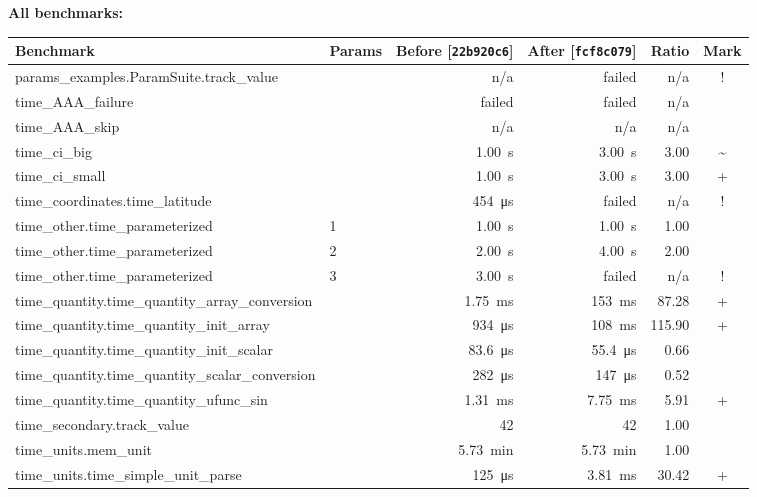 
\noindent
\textbf{All benchmarks:}

\begin{tabular}{llrrrc}
\toprule
Benchmark & Params & Before [\texttt{22b920c6}] & After [\texttt{fcf8c079}] & Ratio & Mark \\
\midrule
params\_examples.ParamSuite.track\_value &  & n/a & failed & n/a & ! \\
time\_AAA\_failure &  & failed & failed & n/a &  \\
time\_AAA\_skip &  & n/a & n/a & n/a &  \\
time\_ci\_big &  & \qty{1.00}{\second} & \qty{3.00}{\second} & \num{3.00} & \textasciitilde{} \\
time\_ci\_small &  & \qty{1.00}{\second} & \qty{3.00}{\second} & \num{3.00} & + \\
time\_coordinates.time\_latitude &  & \qty{454}{\micro\second} & failed & n/a & ! \\
time\_other.time\_parameterized & 1 & \qty{1.00}{\second} & \qty{1.00}{\second} & \num{1.00} &  \\
time\_other.time\_parameterized & 2 & \qty{2.00}{\second} & \qty{4.00}{\second} & \num{2.00} &  \\
time\_other.time\_parameterized & 3 & \qty{3.00}{\second} & failed & n/a & ! \\
time\_quantity.time\_quantity\_array\_conversion &  & \qty{1.75}{\milli\second} & \qty{153}{\milli\second} & \num{87.28} & + \\
time\_quantity.time\_quantity\_init\_array &  & \qty{934}{\micro\second} & \qty{108}{\milli\second} & \num{115.90} & + \\
time\_quantity.time\_quantity\_init\_scalar &  & \qty{83.6}{\micro\second} & \qty{55.4}{\micro\second} & \num{0.66} &  \\
time\_quantity.time\_quantity\_scalar\_conversion &  & \qty{282}{\micro\second} & \qty{147}{\micro\second} & \num{0.52} &  \\
time\_quantity.time\_quantity\_ufunc\_sin &  & \qty{1.31}{\milli\second} & \qty{7.75}{\milli\second} & \num{5.91} & + \\
time\_secondary.track\_value &  & \num{42} & \num{42} & \num{1.00} &  \\
time\_units.mem\_unit &  & \qty{5.73}{\minute} & \qty{5.73}{\minute} & \num{1.00} &  \\
time\_units.time\_simple\_unit\_parse &  & \qty{125}{\micro\second} & \qty{3.81}{\milli\second} & \num{30.42} & + \\

\end{tabular}
